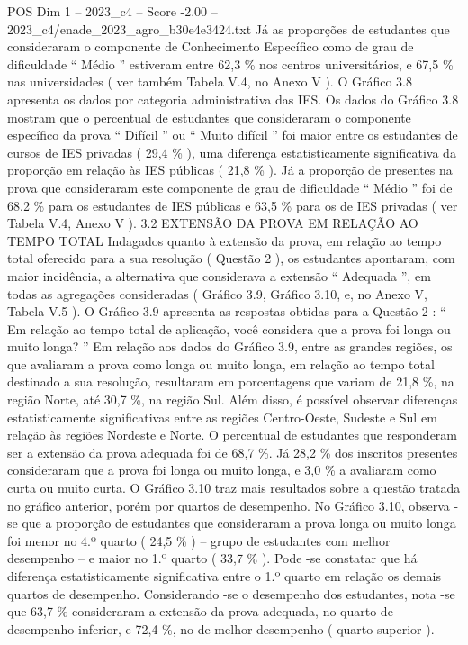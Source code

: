 \begin{textsample}{POS Dim 1 – 2023\_c4 – Score -2.00 – 2023\_c4/enade\_2023\_agro\_b30e4e3424.txt}
Já as proporções de estudantes que consideraram o componente de Conhecimento Específico como de grau de dificuldade “ Médio ” estiveram entre 62,3 \% nos centros universitários, e 67,5 \% nas universidades ( ver também Tabela V.4, no Anexo V ).
O Gráfico 3.8 apresenta os dados por categoria administrativa das IES.
Os dados do Gráfico 3.8 mostram que o percentual de estudantes que consideraram o componente específico da prova “ Difícil ” ou “ Muito difícil ” foi maior entre os estudantes de cursos de IES privadas ( 29,4 \% ), uma diferença estatisticamente significativa da proporção em relação às IES públicas ( 21,8 \% ).
Já a proporção de presentes na prova que consideraram este componente de grau de dificuldade “ Médio ” foi de 68,2 \% para os estudantes de IES públicas e 63,5 \% para os de IES privadas ( ver Tabela V.4, Anexo V ). 3.2 EXTENSÃO DA PROVA EM RELAÇÃO AO TEMPO TOTAL Indagados quanto à extensão da prova, em relação ao tempo total oferecido para a sua resolução ( Questão 2 ), os estudantes apontaram, com maior incidência, a alternativa que considerava a extensão “ Adequada ”, em todas as agregações consideradas ( Gráfico 3.9, Gráfico 3.10, e, no Anexo V, Tabela V.5 ).
O Gráfico 3.9 apresenta as respostas obtidas para a Questão 2 : “ Em relação ao tempo total de aplicação, você considera que a prova foi longa ou muito longa? ” Em relação aos dados do Gráfico 3.9, entre as grandes regiões, os que avaliaram a prova como longa ou muito longa, em relação ao tempo total destinado a sua resolução, resultaram em porcentagens que variam de 21,8 \%, na região Norte, até 30,7 \%, na região Sul.
Além disso, é possível observar diferenças estatisticamente significativas entre as regiões Centro-Oeste, Sudeste e Sul em relação às regiões Nordeste e Norte.
O percentual de estudantes que responderam ser a extensão da prova adequada foi de 68,7 \%.
Já 28,2 \% dos inscritos presentes consideraram que a prova foi longa ou muito longa, e 3,0 \% a avaliaram como curta ou muito curta.
O Gráfico 3.10 traz mais resultados sobre a questão tratada no gráfico anterior, porém por quartos de desempenho.
No Gráfico 3.10, observa -se que a proporção de estudantes que consideraram a prova longa ou muito longa foi menor no 4.º quarto ( 24,5 \% ) – grupo de estudantes com melhor desempenho – e maior no 1.º quarto ( 33,7 \% ).
Pode -se constatar que há diferença estatisticamente significativa entre o 1.º quarto em relação os demais quartos de desempenho.
Considerando -se o desempenho dos estudantes, nota -se que 63,7 \% consideraram a extensão da prova adequada, no quarto de desempenho inferior, e 72,4 \%, no de melhor desempenho ( quarto superior ).

\end{textsample}
